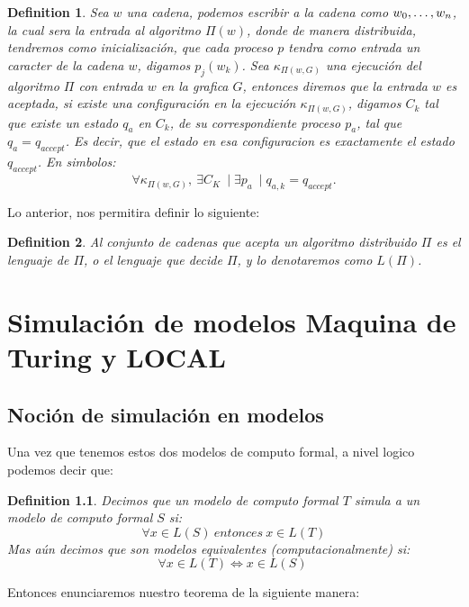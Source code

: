 \documentclass[10pt]{report}
\newtheorem{definition}{Definition}
\begin{document}
    \theoremstyle{definition}
    \begin{definition}
        Sea $w$ una cadena, podemos escribir a la cadena como $w_{0},\mathellipsis, w_{n}$, la cual sera la entrada al algoritmo
        $\Pi(w)$, donde de manera distribuida, tendremos como inicialización, que cada proceso $p$ tendra como entrada un caracter de la cadena $w$, digamos $p_{j}(w_{k})$.\newline
        Sea $\kappa_{\Pi(w,G)}$ una ejecución del algoritmo $\Pi$ con entrada $w$ en la grafica $G$, entonces diremos que
        la entrada $w$ es aceptada, si existe una configuración en la ejecución $\kappa_{\Pi(w,G)}$, digamos $C_{k}$ tal que
        existe un estado $q_{a}$ en $C_{k}$, de su correspondiente proceso $p_{a}$, tal que $q_{a}=q_{accept}$.\newline
        Es decir, que el estado en esa configuracion es exactamente el estado $q_{accept}$.\newline
        En simbolos:
        \begin{equation}
            \forall \kappa_{\Pi(w,G)},\ \exists C_{K}\ \mid \exists p_{a}\ \mid q_{a,k}=q_{accept}.\label{eq:equation4}
        \end{equation}
    \end{definition}

    Lo anterior, nos permitira definir lo siguiente:
    \begin{definition}
        Al conjunto de cadenas que acepta un algoritmo distribuido $\Pi$ es el lenguaje
        de $\Pi$, o el lenguaje que decide $\Pi$, y lo denotaremos como $L(\Pi)$.
    \end{definition}


    \chapter{Simulación de modelos Maquina de Turing y \textbf{LOCAL}}\label{ch:simulacion-de-modelostextbfytextbf}
    \section{Noción de simulación en modelos}\label{sec:nocion-de-simulación-en-modelos}
    Una vez que tenemos estos dos modelos de computo formal, a nivel logico podemos decir que:
    \theoremstyle{definition}
    \begin{definition}
        Decimos que un modelo de computo formal $T$ simula a un modelo de computo formal  $S$ si:
        \begin{equation}
        \forall x\in L(S) \ entonces \ x\in L(T)
        \end{equation}
        Mas aún decimos que son modelos equivalentes (computacionalmente) si:
        \begin{equation}
        \forall x\in L(T) \iff x\in L(S) \
        \end{equation}
    \end{definition}
    \space
    Entonces enunciaremos nuestro teorema de la siguiente manera:
\end{document}
